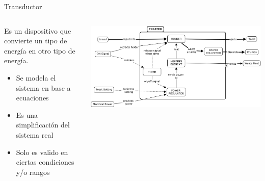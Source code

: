 \documentclass[aspectratio=169]{beamer}
\begin{document}
\begin{frame}{Transductor}
    \begin{columns}[onlytextwidth]
        \begin{column}{0.5\textwidth}
        Es un dispositivo que convierte un tipo de energía en otro tipo de energía.\\[8pt]
        \begin{itemize}
            \item Se modela el sistema en base a ecuaciones
            \item Es una simplificación del sistema real
            \item Solo es valido en ciertas condiciones y/o rangos
        \end{itemize}
        
        
        \end{column}
        \begin{column}{0.5\textwidth}
            \begin{center}
               \includegraphics[width=\textwidth]{fig/tostadora.jpg}
            \end{center}
        \end{column}
    \end{columns}
\end{frame}
\end{document}
